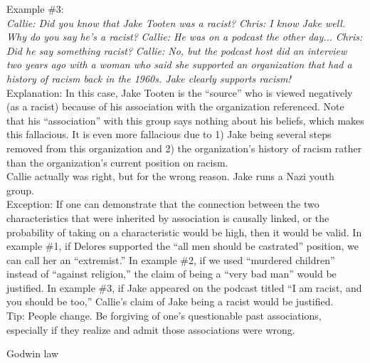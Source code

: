 \documentclass[a4paper,12pt,single,pdftex]{scrbook}
\begin{document}
{    
      Example \#3:
    \\

    
      {\em Callie: Did you know that Jake Tooten was a racist?} \newline
{\em Chris: I know Jake well. Why do you say he’s a racist?} \newline
{\em Callie: He was on a podcast the other day...} \newline
{\em Chris: Did he say something racist?} \newline
{\em Callie: No, but the podcast host did an interview two years ago with a woman who said she supported an organization that had a history of racism back in the 1960s. Jake clearly supports racism!}
    \\

    
      Explanation: In this case, Jake Tooten is the “source” who is viewed negatively (as a racist) because of his association with the organization referenced. Note that his “association” with this group says nothing about his beliefs, which makes this fallacious. It is even more fallacious due to 1) Jake being several steps removed from this organization and 2) the organization’s history of racism rather than the organization’s current position on racism.
    \\

    
      Callie actually was right, but for the wrong reason. Jake runs a Nazi youth group.
    \\

    
      Exception: If one can demonstrate that the connection between the two characteristics that were inherited by association is causally linked, or the probability of taking on a characteristic would be high, then it would be valid. In example \#1, if Delores supported the “all men should be castrated” position, we can call her an “extremist.” In example \#2, if we used “murdered children” instead of “against religion,” the claim of being a “very bad man” would be justified. In example \#3, if Jake appeared on the podcast titled “I am racist, and you should be too,” Callie’s claim of Jake being a racist would be justified.
    \\

    
      Tip: People change. Be forgiving of one’s questionable past associations, especially if they realize and admit those associations were wrong.
    \\

  }


Godwin law
    
\end{document}
